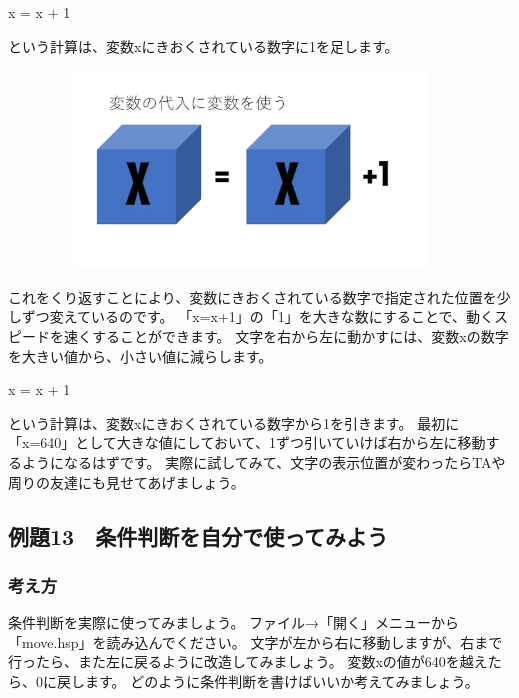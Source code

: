 \begin{description}
    \item x = x + 1
\end{description}

という計算は、変数xにきおくされている数字に1を足します。

\begin{figure}[H]
    \begin{center}
        \includegraphics[keepaspectratio,width=10.689cm,height=5.265cm]{text02-img/text02-img051.png}
    \end{center}
\end{figure}

これをくり返すことにより、変数にきおくされている数字で指定された位置を少しずつ変えているのです。
「x=x+1」の「1」を大きな数にすることで、動くスピードを速くすることができます。
文字を右から左に動かすには、変数xの数字を大きい値から、小さい値に減らします。

\begin{description}
    \item x = x + 1
\end{description}

という計算は、変数xにきおくされている数字から1を引きます。
最初に「x=640」として大きな値にしておいて、1ずつ引いていけば右から左に移動するようになるはずです。
実際に試してみて、文字の表示位置が変わったらTAや周りの友達にも見せてあげましょう。

\clearpage
\subsection{例題13　条件判断を自分で使ってみよう}

\subsubsection*{考え方}

条件判断を実際に使ってみましょう。
ファイル→「開く」メニューから「move.hsp」を読み込んでください。
文字が左から右に移動しますが、右まで行ったら、また左に戻るように改造してみましょう。
変数xの値が640を越えたら、0に戻します。
どのように条件判断を書けばいいか考えてみましょう。

